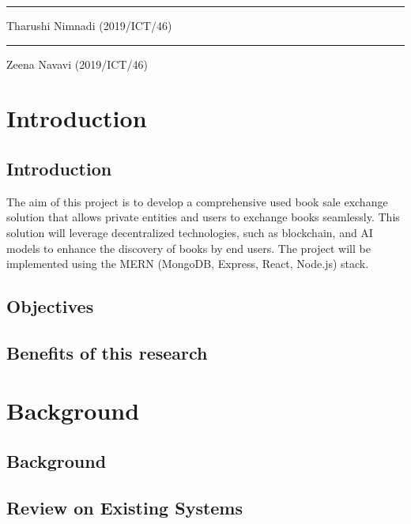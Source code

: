 \documentclass{article}
\begin{document}
\vspace{2cm} %
\rule{5cm}{0.5pt} %
\linebreak
Tharushi Nimnadi (2019/ICT/46)

\vspace{2cm} %
\rule{5cm}{0.5pt} %
\linebreak
Zeena Navavi (2019/ICT/46)

\newpage

\tableofcontents
\newpage

\section{Introduction}
\subsection{Introduction}
The aim of this project is to develop a comprehensive used book sale exchange
solution that allows private entities and users to exchange books seamlessly.
This solution will leverage decentralized technologies, such as blockchain, and
AI models to enhance the discovery of books by end users. The project will be
implemented using the MERN (MongoDB, Express, React, Node.js) stack.

\subsection{Objectives}


\subsection{Benefits of this research}


\section{Background}
\subsection{Background}

\subsection{Review on Existing Systems}

\end{document}
